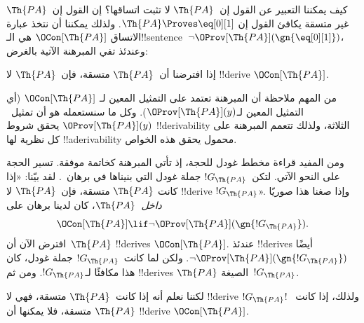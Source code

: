 \documentclass[../../../include/open-logic-section]{subfiles}
\begin{document}


كيف يمكننا التعبير عن القول إن~$\Th{PA}$ لا تثبت اتساقها؟ إن القول
إن~$\Th{PA}$ غير متسقة يكافئ القول إن
$\Th{PA} \Proves \eq[0][1]$. ولذلك يمكننا أن نتخذ عبارة الاتساق
$\OCon[\Th{PA}]$ هي الـ!!{sentence}~$\lnot
\OProv[\Th{PA}](\gn{\eq[0][1]})$، وعندئذ تفي المبرهنة الآتية بالغرض:

\begin{thm}
إذا افترضنا أن~$\Th{PA}$ متسقة، فإن~$\Th{PA}$ لا !!{derive}
$\OCon[\Th{PA}]$.
\end{thm}

من المهم ملاحظة أن المبرهنة تعتمد على التمثيل المعين لـ
$\OCon[\Th{PA}]$ (أي التمثيل المعين لـ$\OProv[\Th{PA}](y)$). وكل ما
سنستعمله هو أن تمثيل~$\OProv[\Th{PA}](y)$ يحقق شروط
!!{derivability} الثلاثة، ولذلك تتعمم المبرهنة على كل نظرية لها
!!a{derivability} محمول يحقق هذه الخواص.

ومن المفيد قراءة مخطط غودل للحجة، إذ تأتي المبرهنة كخاتمة موفقة. تسير
الحجة على النحو الآتي. لتكن~$!G_\Th{PA}$ جملة غودل التي بنيناها في
برهان~. لقد بيّنا: «إذا كانت
$\Th{PA}$ متسقة، فإن~$\Th{PA}$ لا !!{derive} $!G_\Th{PA}$». وإذا
صغنا هذا صوريًا \emph{داخل}~$\Th{PA}$، كان لدينا برهان على
\[
\OCon[\Th{PA}] \lif \lnot \OProv[\Th{PA}](\gn{!G_\Th{PA}}).
\]
افترض الآن أن~$\Th{PA}$ !!{derive}s $\OCon[\Th{PA}]$. عندئذ
!!{derive}s أيضًا $\lnot \OProv[\Th{PA}](\gn{!G_\Th{PA}})$. ولكن لما
كانت~$!G_\Th{PA}$ جملة غودل، كان هذا مكافئًا لـ$!G_\Th{PA}$. ومن ثم
!!{derive}s $\Th{PA}$ الصيغة~$!G_\Th{PA}$.

لكننا نعلم أنه إذا كانت~$\Th{PA}$ متسقة، فهي لا !!{derive}
$!G_\Th{PA}$!{} ولذلك، إذا كانت~$\Th{PA}$ متسقة، فلا يمكنها أن
!!{derive} $\OCon[\Th{PA}]$.
\end{document}
